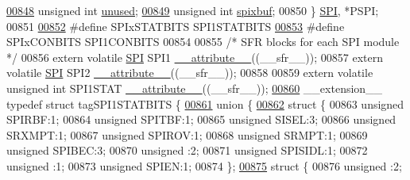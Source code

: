 \begin{DoxyCode}
\hypertarget{a00015_source_l00848}{}\hyperlink{a00014_a1902ff28c01f8dab73ffed44a642ae6a}{00848}         \textcolor{keywordtype}{unsigned} \textcolor{keywordtype}{int} \hyperlink{a00014_a1902ff28c01f8dab73ffed44a642ae6a}{unused};
\hypertarget{a00015_source_l00849}{}\hyperlink{a00014_a5fa797701de92c992d6451c5817a47bd}{00849}         \textcolor{keywordtype}{unsigned} \textcolor{keywordtype}{int} \hyperlink{a00014_a5fa797701de92c992d6451c5817a47bd}{spixbuf};
00850 \} \hyperlink{a00014_d3/de3/a00763}{SPI}, *PSPI;
00851 
\hypertarget{a00015_source_l00852}{}\hyperlink{a00015_a46ce444944af8254e23b8c6a38724609}{00852} \textcolor{preprocessor}{#define SPIxSTATBITS SPI1STATBITS}
\hypertarget{a00015_source_l00853}{}\hyperlink{a00015_ae4ad205f800eddb30bcc3f27d423f002}{00853} \textcolor{preprocessor}{#define SPIxCONBITS SPI1CONBITS}
00854 
00855 \textcolor{comment}{/* SFR blocks for each SPI module */}
00856 \textcolor{keyword}{extern} \textcolor{keyword}{volatile} \hyperlink{a00014_d3/de3/a00763}{SPI} SPI1 \hyperlink{a00015_a493c46f03454991ccc5aa7a6e1dfb2a7}{\_\_attribute\_\_}((\_\_sfr\_\_));
00857 \textcolor{keyword}{extern} \textcolor{keyword}{volatile} \hyperlink{a00014_d3/de3/a00763}{SPI} SPI2 \hyperlink{a00015_a493c46f03454991ccc5aa7a6e1dfb2a7}{\_\_attribute\_\_}((\_\_sfr\_\_));
00858 
00859 \textcolor{keyword}{extern} \textcolor{keyword}{volatile} \textcolor{keywordtype}{unsigned} \textcolor{keywordtype}{int}  SPI1STAT \hyperlink{a00015_a493c46f03454991ccc5aa7a6e1dfb2a7}{\_\_attribute\_\_}((\_\_sfr\_\_));
\hypertarget{a00015_source_l00860}{}\hyperlink{a00014}{00860} \_\_extension\_\_ \textcolor{keyword}{typedef} \textcolor{keyword}{struct }tagSPI1STATBITS \{
\hypertarget{a00015_source_l00861}{}\hyperlink{a00015}{00861}   \textcolor{keyword}{union }\{
\hypertarget{a00015_source_l00862}{}\hyperlink{a00015}{00862}     \textcolor{keyword}{struct }\{
00863       \textcolor{keywordtype}{unsigned} SPIRBF:1;
00864       \textcolor{keywordtype}{unsigned} SPITBF:1;
00865       \textcolor{keywordtype}{unsigned} SISEL:3;
00866       \textcolor{keywordtype}{unsigned} SRXMPT:1;
00867       \textcolor{keywordtype}{unsigned} SPIROV:1;
00868       \textcolor{keywordtype}{unsigned} SRMPT:1;
00869       \textcolor{keywordtype}{unsigned} SPIBEC:3;
00870       \textcolor{keywordtype}{unsigned} :2;
00871       \textcolor{keywordtype}{unsigned} SPISIDL:1;
00872       \textcolor{keywordtype}{unsigned} :1;
00873       \textcolor{keywordtype}{unsigned} SPIEN:1;
00874     \};
\hypertarget{a00015_source_l00875}{}\hyperlink{a00015}{00875}     \textcolor{keyword}{struct }\{
00876       \textcolor{keywordtype}{unsigned} :2;

\end{DoxyCode}
